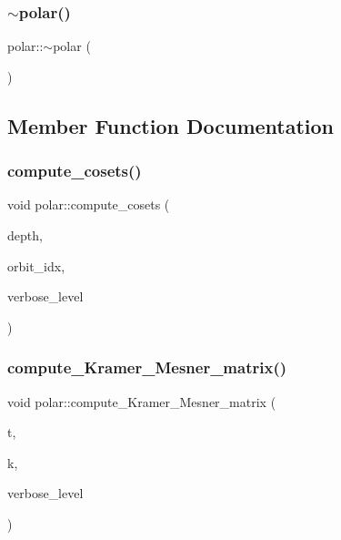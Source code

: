 \mbox{\label{classpolar_a0259a52095fc622c3ba59292a4848f1a}} 
\subsubsection{\texorpdfstring{$\sim$polar()}{~polar()}}
{\footnotesize\ttfamily polar\+::$\sim$polar (\begin{DoxyParamCaption}{ }\end{DoxyParamCaption})}



\subsection{Member Function Documentation}
\mbox{\label{classpolar_a1fae83636607982bad299fd84380fc40}} 
\subsubsection{\texorpdfstring{compute\+\_\+cosets()}{compute\_cosets()}}
{\footnotesize\ttfamily void polar\+::compute\+\_\+cosets (\begin{DoxyParamCaption}\item[{\mbox{\hyperlink{galois_8h_a09fddde158a3a20bd2dcadb609de11dc}{I\+NT}}}]{depth,  }\item[{\mbox{\hyperlink{galois_8h_a09fddde158a3a20bd2dcadb609de11dc}{I\+NT}}}]{orbit\+\_\+idx,  }\item[{\mbox{\hyperlink{galois_8h_a09fddde158a3a20bd2dcadb609de11dc}{I\+NT}}}]{verbose\+\_\+level }\end{DoxyParamCaption})}

\mbox{\label{classpolar_ad558a87988ec31179ccfde947e490381}} 
\subsubsection{\texorpdfstring{compute\+\_\+\+Kramer\+\_\+\+Mesner\+\_\+matrix()}{compute\_Kramer\_Mesner\_matrix()}}
{\footnotesize\ttfamily void polar\+::compute\+\_\+\+Kramer\+\_\+\+Mesner\+\_\+matrix (\begin{DoxyParamCaption}\item[{\mbox{\hyperlink{galois_8h_a09fddde158a3a20bd2dcadb609de11dc}{I\+NT}}}]{t,  }\item[{\mbox{\hyperlink{galois_8h_a09fddde158a3a20bd2dcadb609de11dc}{I\+NT}}}]{k,  }\item[{\mbox{\hyperlink{galois_8h_a09fddde158a3a20bd2dcadb609de11dc}{I\+NT}}}]{verbose\+\_\+level }\end{DoxyParamCaption})}

